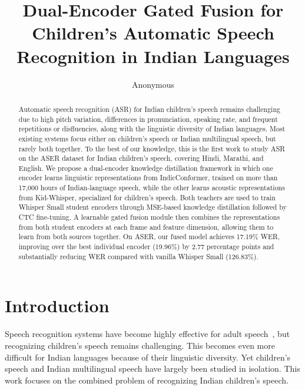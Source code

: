 \documentclass{article} %
\title{Dual-Encoder Gated Fusion for Children's Automatic Speech \\ Recognition in Indian Languages}
\author{Anonymous}
\begin{document}
\maketitle

\begin{abstract}
Automatic speech recognition (ASR) for Indian children's speech remains challenging due to high pitch variation, differences in pronunciation, speaking rate, and frequent repetitions or disfluencies, along with the linguistic diversity of Indian languages. Most existing systems focus either on children's speech or Indian multilingual speech, but rarely both together. To the best of our knowledge, this is the first work to study ASR on the ASER dataset for Indian children's speech, covering Hindi, Marathi, and English. We propose a dual-encoder knowledge distillation framework in which one encoder learns linguistic representations from IndicConformer, trained on more than 17,000 hours of Indian-language speech, while the other learns acoustic representations from Kid-Whisper, specialized for children's speech. Both teachers are used to train Whisper Small student encoders through MSE-based knowledge distillation followed by CTC fine-tuning. A learnable gated fusion module then combines the representations from both student encoders at each frame and feature dimension, allowing them to learn from both sources together. On ASER, our fused model achieves 17.19\% WER, improving over the best individual encoder (19.96\%) by 2.77 percentage points and substantially reducing WER compared with vanilla Whisper Small (126.83\%).
\end{abstract}

\section{Introduction}
\label{sec:intro}

Speech recognition systems have become highly effective for adult speech~\citep{radford2023whisper}, but recognizing children's speech remains challenging. This becomes even more difficult for Indian languages because of their linguistic diversity. Yet children's speech and Indian multilingual speech have largely been studied in isolation. This work focuses on the combined problem of recognizing Indian children's speech.
\end{document}
